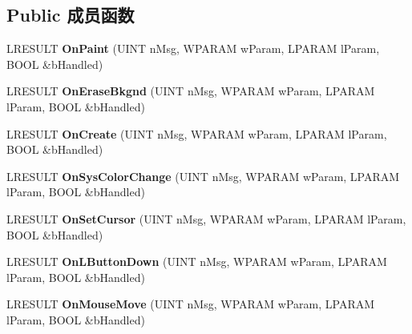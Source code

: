 \subsection*{Public 成员函数}
\begin{DoxyCompactItemize}
\item 
\mbox{\label{class_c_selection_window_a554877e543a8382962103d0f9bbca12c}} 
L\+R\+E\+S\+U\+LT {\bfseries On\+Paint} (U\+I\+NT n\+Msg, W\+P\+A\+R\+AM w\+Param, L\+P\+A\+R\+AM l\+Param, B\+O\+OL \&b\+Handled)
\item 
\mbox{\label{class_c_selection_window_af0357c826afa2702506be0844e4a9dbf}} 
L\+R\+E\+S\+U\+LT {\bfseries On\+Erase\+Bkgnd} (U\+I\+NT n\+Msg, W\+P\+A\+R\+AM w\+Param, L\+P\+A\+R\+AM l\+Param, B\+O\+OL \&b\+Handled)
\item 
\mbox{\label{class_c_selection_window_ad8592e0f3914d040648b95148dd86227}} 
L\+R\+E\+S\+U\+LT {\bfseries On\+Create} (U\+I\+NT n\+Msg, W\+P\+A\+R\+AM w\+Param, L\+P\+A\+R\+AM l\+Param, B\+O\+OL \&b\+Handled)
\item 
\mbox{\label{class_c_selection_window_a335e1af661ae0a866d93624dd1542223}} 
L\+R\+E\+S\+U\+LT {\bfseries On\+Sys\+Color\+Change} (U\+I\+NT n\+Msg, W\+P\+A\+R\+AM w\+Param, L\+P\+A\+R\+AM l\+Param, B\+O\+OL \&b\+Handled)
\item 
\mbox{\label{class_c_selection_window_ace81974aeb41cc1a293749df06a67450}} 
L\+R\+E\+S\+U\+LT {\bfseries On\+Set\+Cursor} (U\+I\+NT n\+Msg, W\+P\+A\+R\+AM w\+Param, L\+P\+A\+R\+AM l\+Param, B\+O\+OL \&b\+Handled)
\item 
\mbox{\label{class_c_selection_window_aaece6f27fdb83be613dffed8ba1b7adb}} 
L\+R\+E\+S\+U\+LT {\bfseries On\+L\+Button\+Down} (U\+I\+NT n\+Msg, W\+P\+A\+R\+AM w\+Param, L\+P\+A\+R\+AM l\+Param, B\+O\+OL \&b\+Handled)
\item 
\mbox{\label{class_c_selection_window_a43462249041e77e1614e640cec4f68ba}} 
L\+R\+E\+S\+U\+LT {\bfseries On\+Mouse\+Move} (U\+I\+NT n\+Msg, W\+P\+A\+R\+AM w\+Param, L\+P\+A\+R\+AM l\+Param, B\+O\+OL \&b\+Handled)
\item 

\end{DoxyCompactItemize}
